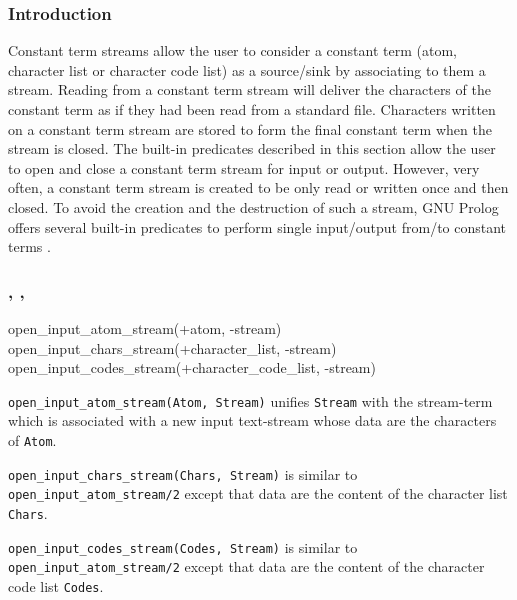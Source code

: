 \subsubsection{Introduction}
\label{Introduction:(Constant-term-streams)}
Constant term streams allow the user to consider a constant term (atom,
character list or character code list) as a source/sink by associating to
them a stream. Reading from a constant term stream will deliver the
characters of the constant term as if they had been read from a standard
file. Characters written on a constant term stream are stored to form the
final constant term when the stream is closed. The built-in predicates
described in this section allow the user to open and close a constant term
stream for input or output. However, very often, a constant term stream is
created to be only read or written once and then closed. To avoid the
creation and the destruction of such a stream, GNU Prolog offers several
built-in predicates to perform single input/output from/to constant terms
.

\subsubsection{,
               , \\
               }

\begin{TemplatesOneCol}
open\_input\_atom\_stream(+atom, -stream)\\
open\_input\_chars\_stream(+character\_list, -stream)\\
open\_input\_codes\_stream(+character\_code\_list, -stream)

\end{TemplatesOneCol}

\Description

\texttt{open\_input\_atom\_stream(Atom, Stream)} unifies \texttt{Stream}
with the stream-term which is associated with a new input text-stream whose
data are the characters of \texttt{Atom}.

\texttt{open\_input\_chars\_stream(Chars, Stream)} is similar to
\texttt{open\_input\_atom\_stream/2} except that data are the content of the
character list \texttt{Chars}.

\texttt{open\_input\_codes\_stream(Codes, Stream)} is similar to
\texttt{open\_input\_atom\_stream/2} except that data are the content of the
character code list \texttt{Codes}.

